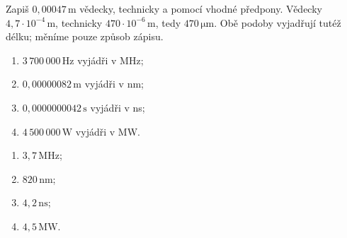\documentclass[11pt,a4paper]{article}
\begin{document}
\begin{prikladReseniBox}[breakable=false,title={Příklad 4: jedna hodnota, dva užitečné zápisy}]
Zapiš $0{,}00047\,\mathrm m$ vědecky, technicky a pomocí vhodné předpony.
\tcblower
Vědecky $4{,}7\cdot10^{-4}\,\mathrm m$,
technicky $470\cdot10^{-6}\,\mathrm m$,
tedy $\boxed{470\,\mathrm{\mu m}}$.
Obě podoby vyjadřují tutéž délku; měníme pouze způsob zápisu.
\end{prikladReseniBox}

\begin{zadaniReseniBox}[breakable=false,title={Samostatná práce 4: technické veličiny}]
\begin{enumerate}[label=\alph*)]
\item $3\,700\,000\,\mathrm{Hz}$ vyjádři v MHz;
\item $0{,}00000082\,\mathrm m$ vyjádři v nm;
\item $0{,}0000000042\,\mathrm s$ vyjádři v ns;
\item $4\,500\,000\,\mathrm W$ vyjádři v MW.
\end{enumerate}
\tcblower
\begin{enumerate}[label=\alph*)]
\item $3{,}7\,\mathrm{MHz}$;
\item $820\,\mathrm{nm}$;
\item $4{,}2\,\mathrm{ns}$;
\item $4{,}5\,\mathrm{MW}$.
\end{enumerate}
\end{zadaniReseniBox}
\end{document}
